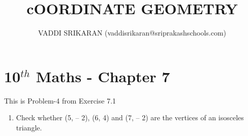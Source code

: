\documentclass[12pt]{article}
\title{cOORDINATE GEOMETRY}
\author{VADDI SRIKARAN (vaddisrikaran@sriprakashschools.com)}
\begin{document}
\maketitle
\section*{10$^{th}$ Maths - Chapter 7}
This is Problem-4 from Exercise 7.1
\begin{enumerate}
\item Check whether (5, – 2), (6, 4) and (7, – 2) are the vertices of an isosceles triangle. \\

	

\end{enumerate}
\end{document}
